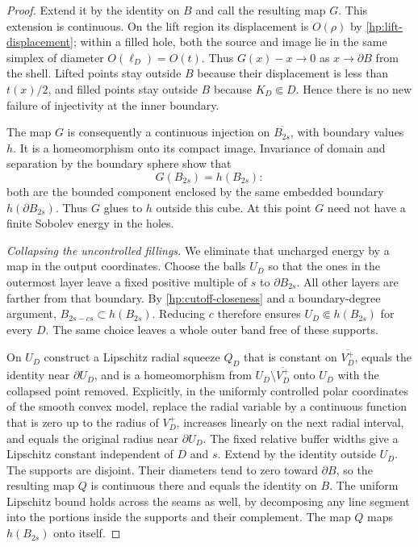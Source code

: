 \documentclass[11pt]{article}
\numberwithin{equation}{section}
\theoremstyle{definition}
\theoremstyle{remark}
\begin{document}
\begin{proof}
Extend it by the identity on $B$ and call the resulting map $G$.
This extension is continuous.  On the lift region its displacement
is $O(\rho)$ by \eqref{hp:lift-displacement}; within a filled hole,
both the source and image lie in the same simplex of diameter
$O(\ell_D)=O(t)$.  Thus $G(x)-x\to0$ as $x\to\partial B$ from the
shell.  Lifted points stay outside $B$ because their displacement is
less than $t(x)/2$, and filled points stay outside $B$ because
$K_D\Subset D$.  Hence there is no new failure of injectivity at
the inner boundary.

The map $G$ is consequently a continuous injection on
$\overline{B_{2s}}$, with boundary values $h$.  It is a homeomorphism
onto its compact image.  Invariance of domain and separation by the
boundary sphere show that
\[
 G(B_{2s})=h(B_{2s}):
\]
both are the bounded component enclosed by the same embedded boundary
$h(\partial B_{2s})$.  Thus $G$ glues to $h$ outside this cube.  At
this point $G$ need not have a finite Sobolev energy in the holes.

\emph{Collapsing the uncontrolled fillings.}
We eliminate that uncharged energy by a map in the output coordinates.
Choose the balls $U_D$ so that the ones in the outermost layer leave
a fixed positive multiple of $s$ to $\partial B_{2s}$.  All other
layers are farther from that boundary.  By
\eqref{hp:cutoff-closeness} and a boundary-degree argument,
$B_{2s-cs}\subset h(B_{2s})$.  Reducing $c$ therefore ensures
$U_D\Subset h(B_{2s})$ for every $D$.  The same choice leaves a
whole outer band free of these supports.

On $U_D$ construct a Lipschitz radial squeeze $Q_D$ that is constant
on $\overline{V_D^+}$, equals the identity near $\partial U_D$, and
is a homeomorphism from
$U_D\setminus\overline{V_D^+}$ onto $U_D$ with the collapsed point
removed.  Explicitly, in the uniformly controlled polar coordinates
of the smooth convex model, replace the radial variable by a
continuous function that is zero up to the radius of $V_D^+$,
increases linearly on the next radial interval, and equals the
original radius near $\partial U_D$.  The fixed relative buffer
widths give a Lipschitz constant independent of $D$ and $s$.
Extend by the identity outside $U_D$.  The supports are disjoint.
Their diameters tend to zero toward $\partial B$, so the resulting
map $Q$ is continuous there and equals the identity on $B$.
The uniform Lipschitz bound holds across the seams as well, by
decomposing any line segment into the portions inside the supports
and their complement.  The map $Q$ maps $h(B_{2s})$ onto itself.


\end{proof}
\end{document}
